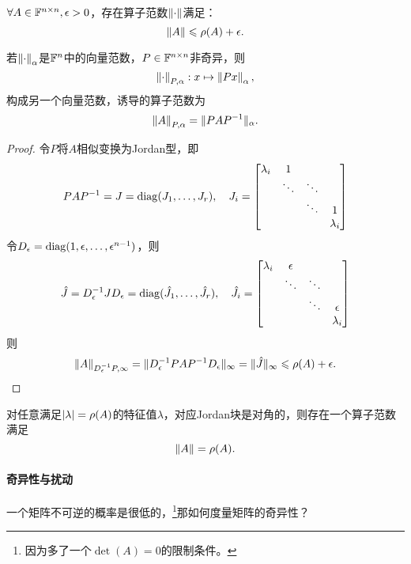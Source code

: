 \begin{theorem}
    {}{}
    $\forall A\in\mathbb F^{n\times n},\epsilon>0$，存在算子范数$\left\lVert\cdot\right\rVert$满足：
    \begin{equation}
        \left\lVert A\right\rVert\leqslant\rho(A)+\epsilon.
    \end{equation}
\end{theorem}

\begin{lemma}
    若$\left\lVert\cdot\right\rVert_\alpha$是$\mathbb F^n$中的向量范数，$P\in\mathbb F^{n\times n}$非奇异，则
    \[
        \left\lVert\cdot\right\rVert_{P,\alpha}:x\mapsto\left\lVert Px\right\rVert_\alpha,
    \]
    构成另一个向量范数，诱导的算子范数为
    \[
        \left\lVert A\right\rVert_{P,\alpha}=\lVert PAP^{-1}\rVert_\alpha.
    \]
\end{lemma}

\begin{proof}
    令$P$将$A$相似变换为Jordan型，即
    \[
        PAP^{-1}=J=\operatorname{diag}(J_1,\ldots,J_r),\quad J_i=\begin{bmatrix}
            \lambda_i&1\\
            &\ddots&\ddots\\
            &&\ddots&1\\
            &&&\lambda_i
        \end{bmatrix}
    \]
    令$D_\epsilon=\operatorname{diag}(1,\epsilon,\ldots,\epsilon^{n-1})$，则 
    \[
        \hat J=D_\epsilon^{-1} JD_\epsilon=\operatorname{diag}(\hat J_1,\ldots,\hat J_r),\quad\hat J_i=\begin{bmatrix}
            \lambda_i&\epsilon\\
            &\ddots&\ddots\\
            &&\ddots&\epsilon\\
            &&&\lambda_i
        \end{bmatrix}
    \]
    则
    \[
        \left\lVert A\right\rVert_{D_\epsilon^{-1} P,\infty}=\lVert D_\epsilon^{-1} PAP^{-1} D_\epsilon\rVert_\infty=\lVert\hat J\rVert_\infty\leqslant\rho(A)+\epsilon.
        \qedhere
    \]
\end{proof}

\begin{remark}
    对任意满足$\left\lvert\lambda\right\rvert=\rho(A)$的特征值$\lambda$，对应Jordan块是对角的，则存在一个算子范数满足
    \[
        \left\lVert A\right\rVert=\rho(A).
    \]
\end{remark}

\paragraph{奇异性与扰动}
一个矩阵不可逆的概率是很低的，\footnote{因为多了一个$\det(A)=0$的限制条件。}那如何度量矩阵的奇异性？%

